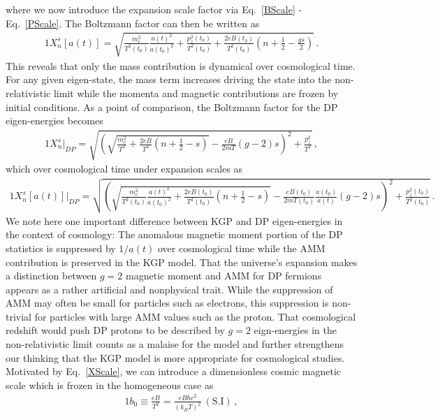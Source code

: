 \documentclass[Universe,article,submit,moreauthors,pdftex]{Definitions/mdpi}
\newcommand*{\req}[1]{Eq.~{\eqref{#1}}}
\begin{document}
where we now introduce the expansion scale factor via \req{BScale} - \req{PScale}. The Boltzmann factor can then be written as
\begin{alignat}{1}
    \label{XScale} X_{n}^{s}[a(t)] = \sqrt{\frac{m_{e}^{2}}{T^{2}(t_{0})}\frac{a(t)^{2}}{a(t_{0})^{2}}+\frac{p_{z}^{2}(t_{0})}{T^{2}(t_{0})}+\frac{2eB(t_{0})}{T^{2}(t_{0})}\left(n+\frac{1}{2}-\frac{gs}{2}\right)}\,.
\end{alignat}
This reveals that only the mass contribution is dynamical over cosmological time. For any given eigen-state, the mass term increases driving the state into the non-relativistic limit while the momenta and magnetic contributions are frozen by initial conditions. As a point of comparison, the Boltzmann factor for the DP eigen-energies becomes
\begin{alignat}{1}
    \label{XDP} X_{n}^{s}\vert_{DP} = \sqrt{\left(\sqrt{\frac{m_{e}^{2}}{T^{2}}+\frac{2eB}{T^{2}}\left(n+\frac{1}{2}-s\right)}-\frac{eB}{2mT}(g-2)s\right)^{2}+\frac{p_{z}^{2}}{T^{2}}}\,,
\end{alignat}
which over cosmological time under expansion scales as
\begin{alignat}{1}
    \label{XScaleDP} X_{n}^{s}[a(t)]\vert_{DP} = \sqrt{\left(\sqrt{\frac{m_{e}^{2}}{T^{2}(t_{0})}\frac{a(t)^{2}}{a(t_{0})^{2}}+\frac{2eB(t_{0})}{T^{2}(t_{0})}\left(n+\frac{1}{2}-s\right)}-\frac{eB(t_{0})}{2mT(t_{0})}\frac{a(t_{0})}{a(t)}(g-2)s\right)^{2}+\frac{p_{z}^{2}(t_{0})}{T^{2}(t_{0})}}\,.
\end{alignat}
We note here one important difference between KGP and DP eigen-energies in the context of cosmology: The anomalous magnetic moment portion of the DP statistics is suppressed by $1/a(t)$ over cosmological time while the AMM contribution is preserved in the KGP model. That the universe's expansion makes a distinction between $g=2$ magnetic moment and AMM for DP fermions appears as a rather artificial and nonphysical trait. While the suppression of AMM may often be small for particles such as electrons, this suppression is non-trivial for particles with large AMM values such as the proton. That cosmological redshift would push DP protons to be described by $g=2$ eign-energies in the non-relativistic limit counts as a malaise for the model and further strengthens our thinking that the KGP model is more appropriate for cosmological studies. Motivated by \req{XScale}, we can introduce a dimensionless cosmic magnetic scale which is frozen in the homogeneous case as
\begin{alignat}{1}
    \label{Bo} b_{0}\equiv\frac{eB}{T^{2}}=\frac{eB\hbar c^{2}}{(k_{B}T)^{2}}\ \mathrm{(S.I)}\,,
\end{alignat}
\end{document}
